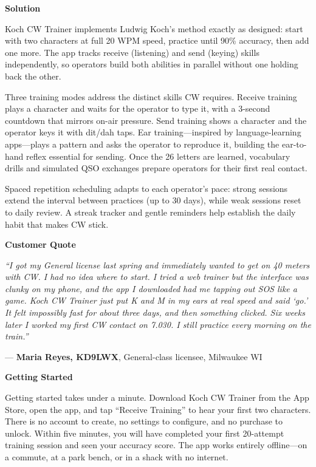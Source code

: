 \documentclass[11pt,letterpaper]{article}
\newcommand{\prsection}[1]{%
  \vspace{1em}%
  {\large\bfseries\color{SectionBlue}#1}%
  \vspace{0.3em}\par%
}
\begin{document}
\prsection{Solution}

Koch CW Trainer implements Ludwig Koch's method exactly as designed: start with two characters at full 20 WPM speed, practice until 90\% accuracy, then add one more. The app tracks receive (listening) and send (keying) skills independently, so operators build both abilities in parallel without one holding back the other.

Three training modes address the distinct skills CW requires. Receive training plays a character and waits for the operator to type it, with a 3-second countdown that mirrors on-air pressure. Send training shows a character and the operator keys it with dit/dah taps. Ear training---inspired by language-learning apps---plays a pattern and asks the operator to reproduce it, building the ear-to-hand reflex essential for sending. Once the 26 letters are learned, vocabulary drills and simulated QSO exchanges prepare operators for their first real contact.

Spaced repetition scheduling adapts to each operator's pace: strong sessions extend the interval between practices (up to 30 days), while weak sessions reset to daily review. A streak tracker and gentle reminders help establish the daily habit that makes CW stick.

\prsection{Customer Quote}

\begin{customerquote}
\textit{``I got my General license last spring and immediately wanted to get on 40 meters with CW. I had no idea where to start. I tried a web trainer but the interface was clunky on my phone, and the app I downloaded had me tapping out SOS like a game. Koch CW Trainer just put K and M in my ears at real speed and said `go.' It felt impossibly fast for about three days, and then something clicked. Six weeks later I worked my first CW contact on 7.030. I still practice every morning on the train.''}

\raggedleft --- \textbf{Maria Reyes, KD9LWX}, General-class licensee, Milwaukee WI
\end{customerquote}

\prsection{Getting Started}

Getting started takes under a minute. Download Koch CW Trainer from the App Store, open the app, and tap ``Receive Training'' to hear your first two characters. There is no account to create, no settings to configure, and no purchase to unlock. Within five minutes, you will have completed your first 20-attempt training session and seen your accuracy score. The app works entirely offline---on a commute, at a park bench, or in a shack with no internet.
\end{document}
